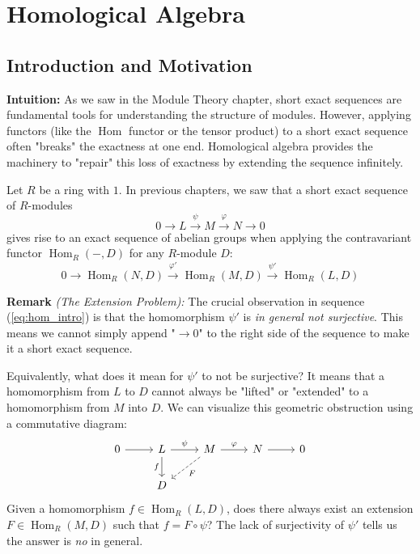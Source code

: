 \chapter{Homological Algebra}

\setcounter{section}{-1}
\section{Introduction and Motivation}

\noindent\textbf{Intuition:} As we saw in the Module Theory chapter, short exact sequences are fundamental tools for understanding the structure of modules. However, applying functors (like the $\operatorname{Hom}$ functor or the tensor product) to a short exact sequence often "breaks" the exactness at one end. Homological algebra provides the machinery to "repair" this loss of exactness by extending the sequence infinitely.

Let $R$ be a ring with $1$. In previous chapters, we saw that a short exact sequence of $R$-modules
\begin{equation}
    0 \longrightarrow L \stackrel{\psi}{\longrightarrow} M \stackrel{\varphi}{\longrightarrow} N \longrightarrow 0 \label{eq:ses_intro}
\end{equation}
gives rise to an exact sequence of abelian groups when applying the contravariant functor $\operatorname{Hom}_R(-, D)$ for any $R$-module $D$:
\begin{equation}
    0 \longrightarrow \operatorname{Hom}_R(N, D) \stackrel{\varphi'}{\longrightarrow} \operatorname{Hom}_R(M, D) \stackrel{\psi'}{\longrightarrow} \operatorname{Hom}_R(L, D) \label{eq:hom_intro}
\end{equation}

\noindent\textbf{Remark} \textit{(The Extension Problem):}
The crucial observation in sequence (\ref{eq:hom_intro}) is that the homomorphism $\psi'$ is \textit{in general not surjective}. This means we cannot simply append "$\longrightarrow 0$" to the right side of the sequence to make it a short exact sequence.

Equivalently, what does it mean for $\psi'$ to not be surjective? It means that a homomorphism from $L$ to $D$ cannot always be "lifted" or "extended" to a homomorphism from $M$ into $D$. We can visualize this geometric obstruction using a commutative diagram:
\[\begin{tikzcd}
    0 \arrow[r] & L \arrow[r, "\psi"] \arrow[d, "f"'] & M \arrow[r, "\varphi"] \arrow[dl, "F", dashed] & N \arrow[r] & 0 \\
                & D & & &
\end{tikzcd}\]
Given a homomorphism $f \in \operatorname{Hom}_R(L, D)$, does there always exist an extension $F \in \operatorname{Hom}_R(M, D)$ such that $f = F \circ \psi$? The lack of surjectivity of $\psi'$ tells us the answer is \textit{no} in general. 


